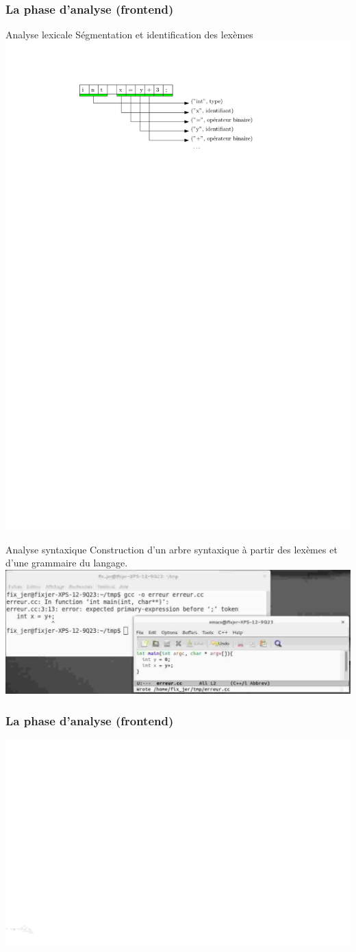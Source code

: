 \documentclass{beamer}
\begin{document}
\begin{frame}
\frametitle{La phase d'analyse (frontend)}
\begin{block}{Analyse lexicale}
Ségmentation et identification des lexèmes\\
\centering\includegraphics[width=0.5\linewidth]{Figs/lexing.pdf}
\end{block}
\begin{block}{Analyse syntaxique}
Construction d'un arbre syntaxique à partir des lexèmes et d'une grammaire du langage.\\
\centering\includegraphics[width=0.6\linewidth]{Figs/erreur_syntaxe.pdf}
\end{block}
\end{frame}

\begin{frame}
\frametitle{La phase d'analyse (frontend)}

\centering\includegraphics[width=\linewidth]{Figs/syntactic_tree.pdf}

\end{frame}
\end{document}

